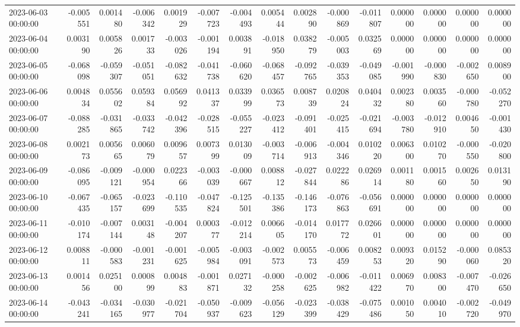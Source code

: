 \begin{tabular}{lrrrrrrrrrrrrrr}
2023-06-03 00:00:00 & -0.005551 & 0.001480 & -0.006342 & 0.001929 & -0.007723 & -0.004493 & 0.005444 & 0.002890 & -0.000869 & -0.011807 & 0.000000 & 0.000000 & 0.000000 & 0.000000 \\
2023-06-04 00:00:00 & 0.003190 & 0.005826 & 0.001733 & -0.003026 & -0.001194 & 0.003891 & -0.018950 & 0.038279 & -0.005003 & 0.032569 & 0.000000 & 0.000000 & 0.000000 & 0.000000 \\
2023-06-05 00:00:00 & -0.068098 & -0.059307 & -0.051051 & -0.082632 & -0.041738 & -0.060620 & -0.068457 & -0.092765 & -0.039353 & -0.049085 & -0.001990 & -0.000830 & -0.002650 & 0.008900 \\
2023-06-06 00:00:00 & 0.004834 & 0.055602 & 0.059384 & 0.056992 & 0.041337 & 0.033999 & 0.036573 & 0.008739 & 0.020824 & 0.040432 & 0.002380 & 0.003560 & -0.000780 & -0.052270 \\
2023-06-07 00:00:00 & -0.088285 & -0.031865 & -0.033742 & -0.042396 & -0.028515 & -0.055227 & -0.023412 & -0.091401 & -0.025415 & -0.021694 & -0.003780 & -0.012910 & 0.004650 & -0.001430 \\
2023-06-08 00:00:00 & 0.002173 & 0.005665 & 0.006079 & 0.009657 & 0.007399 & 0.013009 & -0.003714 & -0.006913 & -0.004346 & 0.010220 & 0.006300 & 0.010270 & -0.000550 & -0.020800 \\
2023-06-09 00:00:00 & -0.086095 & -0.009121 & -0.000954 & 0.022366 & -0.003039 & -0.000667 & 0.008812 & -0.027844 & 0.022286 & 0.026914 & 0.001180 & 0.001560 & 0.002650 & 0.013190 \\
2023-06-10 00:00:00 & -0.067435 & -0.065157 & -0.023699 & -0.110535 & -0.047824 & -0.125501 & -0.135386 & -0.146173 & -0.076863 & -0.056691 & 0.000000 & 0.000000 & 0.000000 & 0.000000 \\
2023-06-11 00:00:00 & -0.010174 & -0.007144 & 0.003148 & -0.004207 & 0.000377 & -0.012214 & 0.006605 & -0.014170 & 0.017772 & 0.026601 & 0.000000 & 0.000000 & 0.000000 & 0.000000 \\
2023-06-12 00:00:00 & 0.008811 & -0.000583 & -0.001231 & -0.001625 & -0.005984 & -0.003091 & -0.002573 & 0.005573 & -0.006459 & 0.008253 & 0.009320 & 0.015290 & -0.000060 & 0.085320 \\
2023-06-13 00:00:00 & 0.001456 & 0.025100 & 0.000899 & 0.004883 & -0.001871 & 0.027132 & -0.000258 & -0.002625 & -0.006982 & -0.011422 & 0.006970 & 0.008300 & -0.007470 & -0.026650 \\
2023-06-14 00:00:00 & -0.043241 & -0.034165 & -0.030977 & -0.021704 & -0.050937 & -0.009623 & -0.056129 & -0.023399 & -0.038429 & -0.075486 & 0.001050 & 0.004010 & -0.002720 & -0.049970 \\

\end{tabular}
